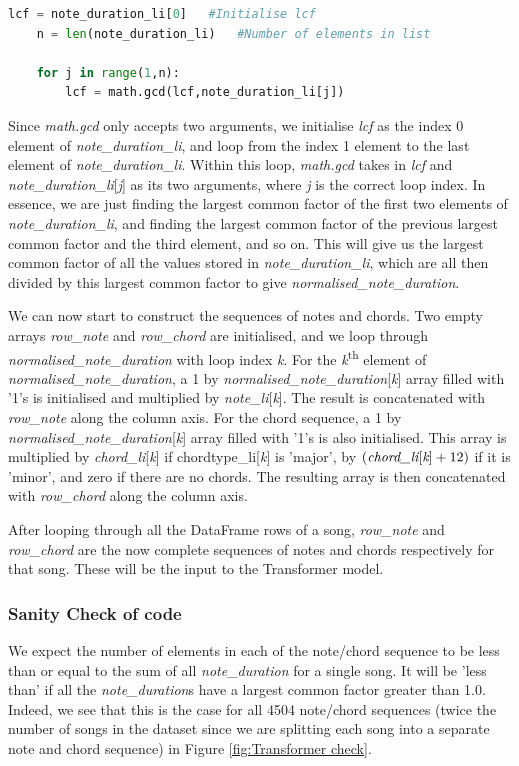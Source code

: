 \begin{lstlisting}[language=Python]
    lcf = note_duration_li[0]   #Initialise lcf
    n = len(note_duration_li)   #Number of elements in list
    
    for j in range(1,n):
        lcf = math.gcd(lcf,note_duration_li[j])
\end{lstlisting}


Since \emph{math.gcd} only accepts two arguments, we initialise \emph{lcf} as the index 0 element of \emph{note\_duration\_li}, and loop from the index 1 element to the last element of \emph{note\_duration\_li}. Within this loop, \emph{math.gcd} takes in \emph{lcf} and \emph{note\_duration\_li}[\emph{j}] as its two arguments, where \emph{j} is the correct loop index. In essence, we are just finding the largest common factor of the first two elements of \emph{note\_duration\_li}, and finding the largest common factor of the previous largest common factor and the third element, and so on. This will give us the largest common factor of all the values stored in \emph{note\_duration\_li}, which are all then divided by this largest common factor to give \emph{normalised\_note\_duration}.

We can now start to construct the sequences of notes and chords. Two empty arrays \emph{row\_note} and \emph{row\_chord} are initialised, and we loop through \emph{normalised\_note\_duration} with loop index \emph{k}. For the \emph{k}\textsuperscript{th} element of \emph{normalised\_note\_duration}, a 1 by \emph{normalised\_note\_duration}[\emph{k}] array filled with '1's is initialised and multiplied by \emph{note\_li}[\emph{k}]. The result is concatenated with \emph{row\_note} along the column axis. For the chord sequence, a 1 by \emph{normalised\_note\_duration}[\emph{k}] array filled with '1's is also initialised. This array is multiplied by \emph{chord\_li}[\emph{k}] if chordtype\_li[\emph{k}] is 'major', by $(\emph{chord\_li}[\emph{k}] + 12)$ if it is 'minor', and zero if there are no chords. The resulting array is then concatenated with \emph{row\_chord} along the column axis.

After looping through all the DataFrame rows of a song, \emph{row\_note} and \emph{row\_chord} are the now complete sequences of notes and chords respectively for that song. These will be the input to the Transformer model.

\subsubsection{Sanity Check of code}
We expect the number of elements in each of the note/chord sequence to be less than or equal to the sum of all \emph{note\_duration} for a single song. It will be 'less than' if all the \emph{note\_duration}s have a largest common factor greater than 1.0. Indeed, we see that this is the case for all 4504 note/chord sequences (twice the number of songs in the dataset since we are splitting each song into a separate note and chord sequence) in Figure \ref{fig:Transformer check}.

